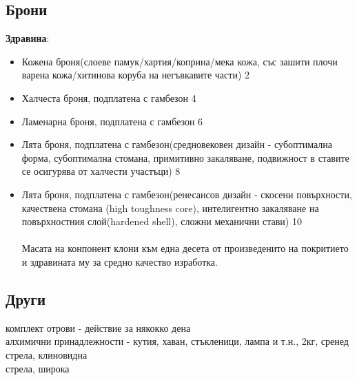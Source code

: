 
\subsection{Брони}






\textbf{Здравина}:
\begin{itemize}[topsep=-0cm, partopsep=0cm, parsep=0cm, itemsep=0cm]
\item{Кожена броня(слоеве памук/хартия/коприна/мека кожа, със зашити плочи варена кожа/хитинова коруба на негъвкавите части) 2}
\item{Халчеста броня, подплатена с гамбезон 4}
\item{Ламенарна броня, подплатена с гамбезон 6}
\item{Лята броня, подплатена с гамбезон(средновековен дизайн - субоптимална форма, субоптимална стомана, примитивно закаляване, подвижност в ставите се осигурява от халчести участъци) 8}
\item{Лята броня, подплатена с гамбезон(ренесансов дизайн - скосени повърхности, качествена стомана (high toughness core),  интелигентно закаляване на повърхностния слой(hardened shell), сложни механични стави) 10}
\\
\\
Масата на конпонент клони към една десета от произведенито на покритието и здравината му за средно качество изработка.
\end{itemize}

\subsection{Други}
комплект отрови - действие за някокко дена \\
алхимични принадлежности - кутия, хаван, стъкленици, лампа и т.н., 2кг, сренед  \\
стрела, клиновидна  \\
стрела, широка  \\
